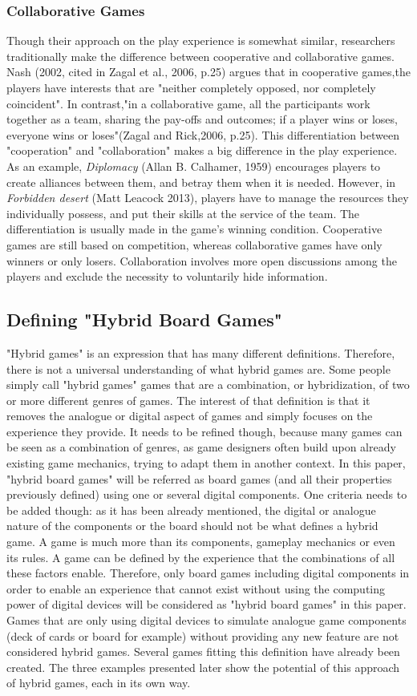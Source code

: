 \subsubsection{Collaborative Games}
Though their approach on the play experience is somewhat similar, researchers traditionally make the difference between cooperative and collaborative games. Nash (2002, cited in Zagal et al., 2006, p.25) argues that in cooperative games,the players have interests that are "neither completely opposed, nor completely coincident". In contrast,"in a collaborative game, all the participants work together as a team, sharing the pay-offs and outcomes; if a player wins or loses, everyone wins or loses"(Zagal and Rick,2006, p.25). This differentiation between "cooperation" and "collaboration" makes a big difference in the play experience. As an example, \textit{Diplomacy} (Allan B. Calhamer, 1959) encourages players to create alliances between them, and betray them when it is needed. However, in \textit{Forbidden desert} (Matt Leacock 2013), players have to manage the resources they individually possess, and put their skills at the service of the team. 
The differentiation is usually made in the game's winning condition. Cooperative games are still based on competition, whereas collaborative games have only winners or only losers. Collaboration involves more open discussions among the players and exclude the necessity to voluntarily hide information. 


\subsection{Defining "Hybrid Board Games"}
"Hybrid games" is an expression that has many different definitions. Therefore, there is not a universal understanding of what hybrid games are. Some people simply call "hybrid games" games that are a combination, or hybridization, of two or more different genres of games. The interest of that definition is that it removes the analogue or digital aspect of games and simply focuses on the experience they provide. It needs to be refined though, because many games can be seen as a combination of genres, as game designers often build upon already existing game mechanics, trying to adapt them in another context. In this paper, "hybrid board games" will be referred as board games (and all their properties previously defined) using one or several digital components. One criteria needs to be added though: as it has been already mentioned, the digital or analogue nature of the components or the board should not be what defines a hybrid game. A game is much more than its components, gameplay mechanics or even its rules. A game can be defined by the experience that the combinations of all these factors enable. Therefore, only board games including digital components in order to enable an experience that cannot exist without using the computing power of digital devices will be considered as "hybrid board games" in this paper. Games that are only using digital devices to simulate analogue game components (deck of cards or board for example) without providing any new feature are not considered hybrid games. Several games fitting this definition have already been created. The three examples presented later show the potential of this approach of hybrid games, each in its own way.
